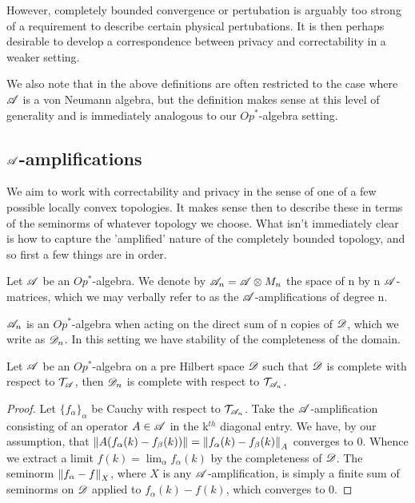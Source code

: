 \documentclass[../main.tex]{subfiles}
\begin{document}
However, completely bounded convergence or pertubation is arguably too strong of a 
requirement to describe certain physical pertubations. It is then perhaps desirable to 
develop a correspondence between privacy and correctability in a weaker setting.

We also note that in the above definitions are often restricted to the case where 
$\mathscr{A}$ is a von Neumann algebra, but the definition makes sense at this level of 
generality and is immediately analogous to our $Op^*$-algebra setting.

\subsection{$\mathscr{A}$-amplifications}

We aim to work with correctability and privacy in the sense of one of a few possible 
locally convex topologies. It makes sense then to describe these in terms of the 
seminorms of whatever topology we choose. What isn't immediately clear is how to capture
the 'amplified' nature of the completely bounded topology, and so first a few things are
in order.

\begin{definition}

Let $\mathscr{A}$ be an $Op^*$-algebra. We denote by $\mathscr{A}_n = \mathscr{A} \otimes M_n$ 
the space of n by n $\mathscr{A}$-matrices, which we may verbally refer to as the
$\mathscr{A}$-amplifications of degree n.

\end{definition}

$\mathscr{A}_n$ is an $Op^*$-algebra when acting on the direct sum of n copies of 
$\mathscr{D}$, which we write as $\mathscr{D}_n$. In this setting we have stability of the 
completeness of the domain.

\begin{proposition}

Let $\mathscr{A}$ be an $Op^*$-algebra on a pre Hilbert space $\mathscr{D}$ such that $\mathscr{D}$ is 
complete with respect to $\mathcal{T}_\mathscr{A}$, then $\mathscr{D}_n$ is complete with 
respect to $\mathcal{T}_{\mathscr{A}_n}$.

\begin{proof}

	Let $\{f_\alpha\}_\alpha$ be Cauchy with respect to 
	$\mathcal{T}_{\mathscr{A}_n}$. Take the $\mathscr{A}$-amplification consisting 
	of an operator $A \in \mathscr{A}$ in the k$^{th}$ diagonal entry. We have, by our 
	assumption, that 
	$\left\lVert A(f_\alpha(k) - f_\beta(k))\right\rVert = \left\lVert f_\alpha(k) - f_\beta(k)\right\rVert_A$ 
	converges to 0. Whence we extract a limit $f(k) = \lim_\alpha f_\alpha(k)$ by
	the completeness of $\mathscr{D}$. The seminorm $\left\lVert f_\alpha - f\right\rVert_X$, 
	where $X$ is any $\mathscr{A}$-amplification, is simply a finite sum of seminorms 
	on $\mathscr{D}$ applied to $f_\alpha(k) - f(k)$, which converges to 0.
\end{proof}

\end{proposition}
\end{document}
